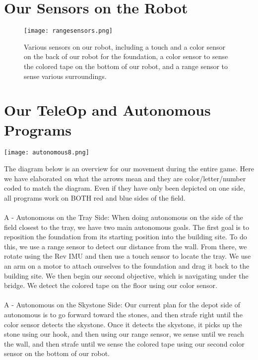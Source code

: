 \documentclass{article}[12pt]
\begin{document}
\section{Our Sensors on the Robot}

	\begin{center}
 	\begin{figure}[!htb]
		{\texttt{[image: rangesensors.png]}}
		\caption{Various sensors on our robot, including a touch and a color sensor on the back of our robot for the foundation, a color sensor to sense the colored tape on the bottom of our robot, and a range sensor to sense various surroundings.}
	\end{figure}
	\end{center}


\section{Our TeleOp and Autonomous Programs}

\begin{center}{\texttt{[image: autonomous8.png]}}\end{center}

The diagram below is an overview for our movement during the entire game. Here we have elaborated on what the arrows mean and they are color/letter/number coded to match the diagram. Even if they have only been depicted on one side, all programs work on BOTH red and blue sides of the field.\\ \\

{\color{RoyalPurple}A - Autonomous on the Tray Side:} When doing autonomous on the side of the field closest to the tray, we have two main autonomous goals. The first goal is to reposition the foundation from its starting position into the building site. To do this, we use a range sensor to detect our distance from the wall. From there, we rotate using the Rev IMU and then use a touch sensor to locate the tray. We use an arm on a motor to attach ourselves to the foundation and drag it back to the building site. We then begin our second objective, which is navigating under the bridge. We detect the colored tape on the floor using our color sensor.\\ \\

	{\color{RoyalPurple}A - Autonomous on the Skystone Side:} Our current plan for the depot side of autonomous is to go forward toward the stones, and then strafe right until the color sensor detects the skystone. Once it detects the skystone, it picks up the stone using our hook, and then using our range sensor, we sense until we reach the wall, and then strafe until we sense the colored tape using our second color sensor on the bottom of our robot. \\ \\ 
\end{document}
